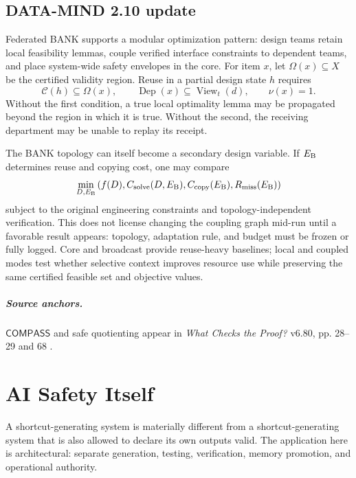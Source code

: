 \documentclass[11pt,oneside]{book}
\theoremstyle{definition}
\theoremstyle{remark}
\newcommand{\COMPASS}{\mathsf{COMPASS}}
\newcommand{\Dep}{\operatorname{Dep}}
\newcommand{\View}{\operatorname{View}}
\begin{document}
\section{DATA-MIND 2.10 update}
Federated BANK supports a modular optimization pattern: design teams retain local feasibility lemmas,
couple verified interface constraints to dependent teams, and place system-wide safety envelopes in
the core. For item \(x\), let \(\Omega(x)\subseteq X\) be the certified validity region. Reuse in a
partial design state \(h\) requires
\[
\mathcal C(h)\subseteq\Omega(x),
\qquad \Dep(x)\subseteq\View_t(d),
\qquad \nu(x)=1.
\]
Without the first condition, a true local optimality lemma may be propagated beyond the region in
which it is true. Without the second, the receiving department may be unable to replay its receipt.

The BANK topology can itself become a secondary design variable. If \(E_{\rm B}\) determines reuse
and copying cost, one may compare
\[
\min_{D,E_{\rm B}}
\left(f(D),C_{\rm solve}(D,E_{\rm B}),C_{\rm copy}(E_{\rm B}),
R_{\rm miss}(E_{\rm B})\right)
\]
subject to the original engineering constraints and topology-independent verification. This does not
license changing the coupling graph mid-run until a favorable result appears: topology, adaptation
rule, and budget must be frozen or fully logged. Core and broadcast provide reuse-heavy baselines;
local and coupled modes test whether selective context improves resource use while preserving the same
certified feasible set and objective values.

\paragraph{Source anchors.} \(\COMPASS\) and safe quotienting appear in
\emph{What Checks the Proof?} v6.80, pp. 28--29 and 68 \cite{TennesonChecks}.

\chapter{AI Safety Itself}
\label{ch:ai}

A shortcut-generating system is materially different from a shortcut-generating system that is also
allowed to declare its own outputs valid. The application here is architectural: separate generation,
testing, verification, memory promotion, and operational authority.
\end{document}
